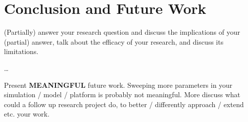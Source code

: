 
\section{Conclusion and Future Work}
\label{sec:Conclusion}

(Partially) answer your research question and discuss the implications of your (partial) answer, talk about the efficacy of your research, and discuss its limitations. 

\dots

Present \textbf{MEANINGFUL} future work. Sweeping more parameters in your simulation / model / platform is probably not meaningful. More discuss what could a follow up research project do, to better / differently approach / extend etc. your work.
